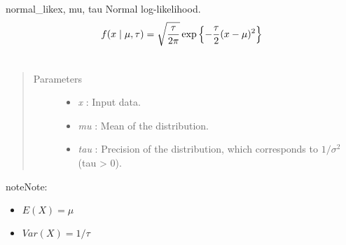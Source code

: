 \hypertarget{pymc.distributions.normal_like}{}\begin{funcdesc}{normal\_like}{x, mu, tau}
Normal log-likelihood.
\begin{gather}
\begin{split}f(x \mid \mu, \tau) = \sqrt{\frac{\tau}{2\pi}} \exp\left\{ -\frac{\tau}{2} (x-\mu)^2 \right\}\end{split}\notag\\\begin{split}\end{split}\notag
\end{gather}\begin{quote}\begin{description}
\item[Parameters] \leavevmode\begin{itemize}
\item {} 
\emph{x} : Input data.

\item {} 
\emph{mu} : Mean of the distribution.

\item {} 
\emph{tau} : Precision of the distribution, which corresponds to $1/\sigma^2$ (tau \textgreater{} 0).

\end{itemize}

\end{description}\end{quote}

\begin{notice}{note}{Note:}\begin{itemize}
\item {} 
$E(X) = \mu$

\item {} 
$Var(X) = 1/\tau$

\end{itemize}
\end{notice}
\end{funcdesc}

